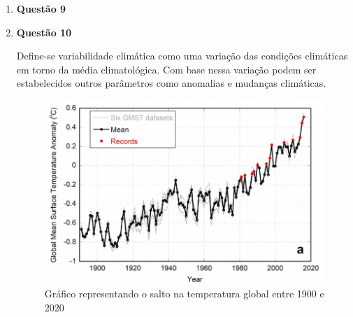 \documentclass[a4paper, 12pt]{article}
\begin{document}
\begin{enumerate}
		\item[]\textbf{Questão 9} 
		
		\item[]\textbf{Questão 10} 
		
		\hspace{1cm}Define-se variabilidade climática como uma variação das condições climáticas em torno da média climatológica. Com base nessa variação podem ser estabelecidos outros parâmetros como anomalias e mudanças climáticas.
		
		\begin{figure}[!h]
			\centering
			\includegraphics[scale=.5]{images/graphic.jpg}
			\caption{Gráfico representando o salto na temperatura global entre 1900 e 2020}
		\end{figure}
	\end{enumerate}
\end{document}
